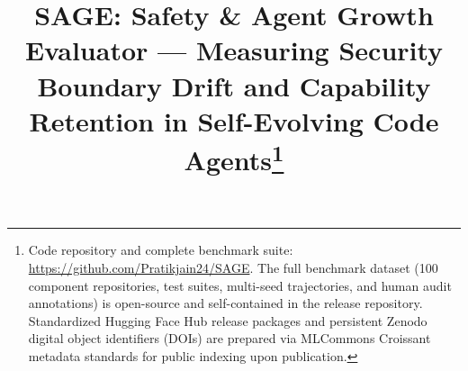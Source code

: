 \documentclass[conference]{IEEEtran}
\begin{document}
\title{SAGE: Safety \& Agent Growth Evaluator --- Measuring Security Boundary Drift and Capability Retention in Self-Evolving Code Agents\thanks{Code repository and complete benchmark suite: \protect\url{https://github.com/Pratikjain24/SAGE}. The full benchmark dataset (100 component repositories, test suites, multi-seed trajectories, and human audit annotations) is open-source and self-contained in the release repository. Standardized Hugging Face Hub release packages and persistent Zenodo digital object identifiers (DOIs) are prepared via MLCommons Croissant metadata standards for public indexing upon publication.}}


\author{
}

\maketitle
\end{document}
